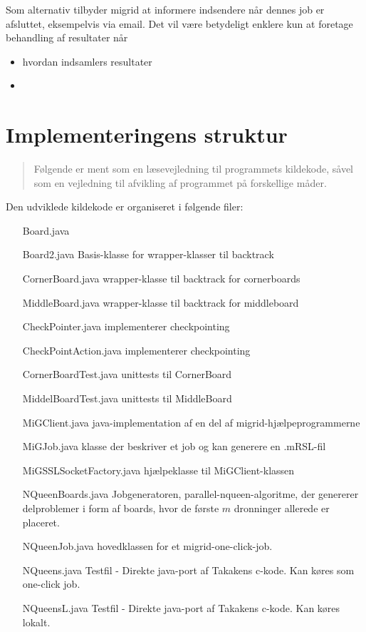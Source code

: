 \documentclass[a4,10pt]{article}
\begin{document}
Som alternativ tilbyder migrid at informere indsendere når dennes job er afsluttet, eksempelvis via email. Det vil være betydeligt enklere kun at foretage behandling af resultater når   
\begin{itemize}
	\item hvordan indsamlers resultater
	\item
\end{itemize}


\section{Implementeringens struktur}\label{implementeringensstruktur}
\begin{verse}
	Følgende er ment som en læsevejledning til programmets kildekode, såvel som en vejledning til afvikling af programmet på forskellige måder. 
\end{verse}

Den udviklede kildekode er organiseret i følgende filer:
\begin{itemize}
	\item[Board.java] 
	\item[Board2.java] Basis-klasse for wrapper-klasser til backtrack
	\item[CornerBoard.java] wrapper-klasse til backtrack for cornerboards
	\item[MiddleBoard.java] wrapper-klasse til backtrack for middleboard
	\item[CheckPointer.java] implementerer checkpointing
	\item[CheckPointAction.java] implementerer checkpointing
	\item[CornerBoardTest.java] unittests til CornerBoard
	\item[MiddelBoardTest.java] unittests til MiddleBoard
	\item[MiGClient.java] java-implementation af en del af migrid-hjælpeprogrammerne
	\item[MiGJob.java] klasse der beskriver et job og kan generere en .mRSL-fil
	\item[MiGSSLSocketFactory.java] hjælpeklasse til MiGClient-klassen
	\item[NQueenBoards.java] Jobgeneratoren, parallel-nqueen-algoritme, der genererer delproblemer i form af boards, hvor de første $m$ dronninger allerede er placeret. 
	\item[NQueenJob.java] hovedklassen for et migrid-one-click-job. 
	\item[NQueens.java] Testfil - Direkte java-port af Takakens c-kode. Kan køres som one-click job.
	\item[NQueensL.java] Testfil - Direkte java-port af Takakens c-kode. Kan køres lokalt.
\end{itemize}
\end{document}

